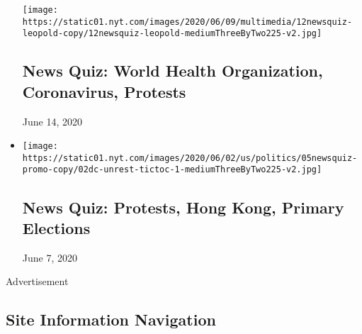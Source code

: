 \begin{itemize}
  \texttt{[image: https://static01.nyt.com/images/2020/06/09/multimedia/12newsquiz-leopold-copy/12newsquiz-leopold-mediumThreeByTwo225-v2.jpg]}

  \hypertarget{news-quiz-world-health-organization-coronavirus-protests}{%
  \subsection{News Quiz: World Health Organization, Coronavirus,
  Protests}\label{news-quiz-world-health-organization-coronavirus-protests}}

  June 14, 2020
\item
  \href{https://www.nytimes.com/interactive/2020/06/05/briefing/protests-hong-kong-primary-elections-news-quiz.html}{}

  \texttt{[image: https://static01.nyt.com/images/2020/06/02/us/politics/05newsquiz-promo-copy/02dc-unrest-tictoc-1-mediumThreeByTwo225-v2.jpg]}

  \hypertarget{news-quiz-protests-hong-kong-primary-elections}{%
  \subsection{News Quiz: Protests, Hong Kong, Primary
  Elections}\label{news-quiz-protests-hong-kong-primary-elections}}

  June 7, 2020
\end{itemize}

Advertisement

\hypertarget{site-information-navigation}{%
\subsection{Site Information
Navigation}\label{site-information-navigation}}

